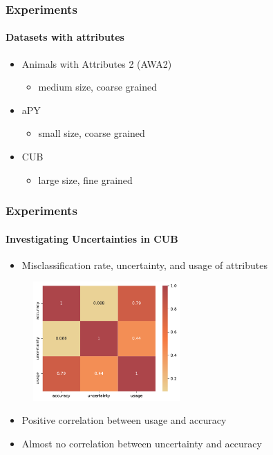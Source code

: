 \documentclass[9pt]{beamer}
\begin{document}
\begin{frame}
\frametitle{Experiments}
\framesubtitle{Datasets with attributes}
\begin{itemize}
	\item Animals with Attributes 2 (AWA2)
	\begin{itemize}
		\item medium size, coarse grained
	\end{itemize}
	\item aPY
	\begin{itemize}
		\item small size, coarse grained
	\end{itemize}	
	\item CUB
	\begin{itemize}
		\item large size, fine grained
	\end{itemize}
\end{itemize}
\end{frame}



\begin{frame}	
\frametitle{Experiments}
\framesubtitle{Investigating Uncertainties in CUB}
\begin{itemize}
	\item Misclassification rate, uncertainty, and usage of attributes
\end{itemize} 
	\begin{figure}
		\centering
		\includegraphics[width=0.5\textwidth]{images/corr_matrix.pdf}
	\end{figure}
	\begin{itemize}
		\item Positive correlation between usage and accuracy
		\item Almost no correlation between uncertainty and accuracy
	\end{itemize}
\end{frame}
\end{document}
